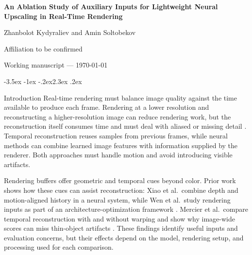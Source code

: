\documentclass[11pt,a4paper]{article}
\makeatletter
\renewcommand\section{\@startsection{section}{1}{\z@}%
  {-3.5ex \@plus -1ex \@minus -.2ex}{2.3ex \@plus .2ex}%
  {\normalfont\Large\bfseries\raggedright}}
\makeatother
\begin{document}
\hypersetup{pageanchor=false}
\begin{titlepage}
\centering
\vspace*{0.18\textheight}
{\LARGE\bfseries An Ablation Study of Auxiliary Inputs for Lightweight Neural Upscaling in Real-Time Rendering\par}
\vspace{2.5cm}
{\large Zhanbolot Kydyraliev \quad and \quad Amin Soltobekov\par}
\vspace{0.5cm}
{\large Affiliation to be confirmed\par}
\vfill
{\large Working manuscript --- \today\par}
\end{titlepage}
\hypersetup{pageanchor=true}

\setlength{\columnsep}{0.25in}
\twocolumn
\raggedbottom
\setlength{\emergencystretch}{3em}

\begin{abstract}
This manuscript is in preparation. The abstract will be written after the research question, experimental protocol, and results are finalized.
\end{abstract}

\section{Introduction}
Real-time rendering must balance image quality against the time available to
produce each frame. Rendering at a lower resolution and reconstructing a
higher-resolution image can reduce rendering work, but the reconstruction
itself consumes time and must deal with aliased or missing detail
\cite{xiao2020neural,mercier2023efficient}. Temporal reconstruction reuses
samples from previous frames, while neural methods can combine learned image
features with information supplied by the renderer. Both approaches must
handle motion and avoid introducing visible artifacts.

Rendering buffers offer geometric and temporal cues beyond color. Prior
work shows how these cues can assist reconstruction: Xiao et al.\ combine
depth and motion-aligned history in a neural system, while Wen et al.\ study
rendering inputs as part of an architecture-optimization framework
\cite{xiao2020neural,wen2025cgsr}. Mercier et al.\ compare temporal
reconstruction with and without warping and show why image-wide scores can
miss thin-object artifacts \cite{mercier2023efficient}. These findings
identify useful inputs and evaluation concerns, but their effects depend on
the model, rendering setup, and processing used for each comparison.
\end{document}
